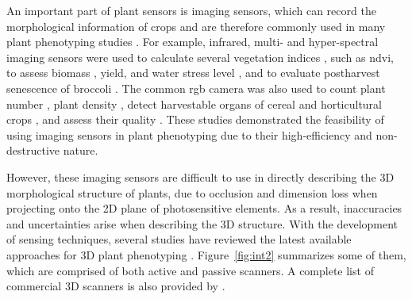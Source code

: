


An important part of plant sensors is imaging sensors, which can record the morphological information of crops and are therefore commonly used in many plant phenotyping studies \citep{paulus_measuring_2019, feng_comprehensive_2021}. For example, infrared, multi- and hyper-spectral imaging sensors were used to calculate several vegetation indices \citep{han_modeling_2019}, such as \gls{ndvi}, to assess biomass \citep{jimenez-berni_high_2018}, yield, and water stress level \citep{herrero_yield_2020, romano_use_2011}, and to evaluate postharvest senescence of broccoli \citep{guo_evaluation_2022}. The common \gls{rgb} camera was also used to count plant number \citep{liu_estimating_2022}, plant density \citep{velumani_estimates_2021}, detect harvestable organs of cereal and horticultural crops \citep{blok_machine_2016}, and assess their quality \citep{stansell_use_2017}. These studies demonstrated the feasibility of using imaging sensors in plant phenotyping due to their high-efficiency and non-destructive nature.

However, these imaging sensors are difficult to use in directly describing the 3D morphological structure of plants, due to occlusion and dimension loss when projecting onto the 2D plane of photosensitive elements. As a result, inaccuracies and uncertainties arise when describing the 3D structure. With the development of sensing techniques, several studies have reviewed the latest available approaches for 3D plant phenotyping \citep{paulus_measuring_2019, okura_3d_2022, kochi_introduction_2021}. Figure~\ref{fig:int2} summarizes some of them, which are comprised of both active and passive scanners. A complete list of commercial 3D scanners is also provided by \citet{bartol_review_2021}.

